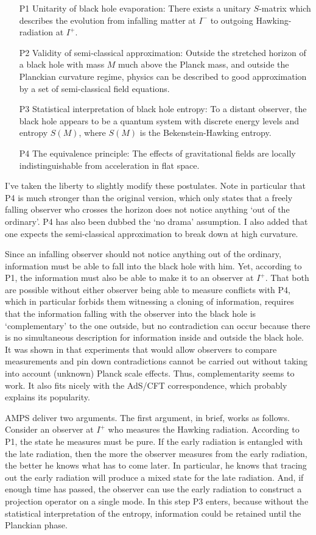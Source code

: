 \documentclass[11pt,twoside]{article}
\begin{document}
\begin{itemize}
\item[P1] Unitarity of black hole evaporation: There exists a unitary $S$-matrix which describes
the evolution from infalling matter at $I^-$ to outgoing Hawking-radiation at $I^+$.
\item[P2] Validity of semi-classical approximation: Outside the stretched horizon of a black hole with 
mass $M$ much above the Planck mass, and outside the Planckian curvature regime, physics
can be described to good approximation by a set of semi-classical field equations.
\item[P3] Statistical interpretation of black hole entropy: To a distant observer, the black hole
appears to be a quantum system with discrete energy levels and entropy $S(M)$, where $S(M)$ is the Bekenstein-Hawking entropy.
\item[P4] The equivalence principle: The effects of gravitational fields are locally indistinguishable from acceleration in flat space.
\end{itemize}

I've taken the liberty to slightly modify these postulates. Note in particular that P4 is much stronger
than the original version, which only states that a freely falling observer who crosses the horizon
does not notice anything `out of the ordinary'. P4 has also been dubbed the `no drama' assumption.
I also added that one expects the semi-classical approximation to break down at high
curvature.

Since an infalling observer should not notice anything out of the ordinary, information must be
able to fall into the black hole with him. Yet, according to P1, the information must also 
be able to make it to an observer at $I^+$. That both are possible without either observer being able to measure
conflicts with P4, which in particular forbids them witnessing a cloning of information, requires that the information 
falling with the observer into the black hole is
`complementary' to the one outside, but no contradiction can occur because there is no simultaneous
description for information inside and outside the black hole. It was shown in \cite{Susskind:1993mu}
that experiments that would allow observers to compare measurements and pin down contradictions 
cannot be carried out without taking into account (unknown) Planck scale effects. Thus, complementarity
seems to work. It also fits nicely with the AdS/CFT correspondence, which probably explains its
popularity.

{\sc AMPS} deliver two arguments. The first argument, in brief, works as follows. Consider an 
observer at $I^+$ who measures the
Hawking radiation. According to P1, the state he measures must be pure. If the early radiation is entangled
with the late radiation, then the more the observer measures from the early radiation, the better
he knows what has to come later. In particular, he knows that tracing out the early radiation will
produce a mixed state for the late radiation. And, if enough time has passed, the observer can 
use the early radiation to construct
a projection operator on a single mode. In this step P3 enters, because without the statistical
interpretation of the entropy, information could be retained until the Planckian phase. 
\end{document}

